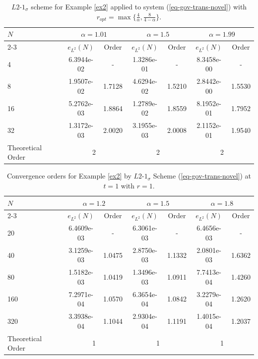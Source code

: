 \documentclass[11pt]{article}
\numberwithin{equation}{section}
\begin{document}
\iffalse
\begin{table}[!ht]
\caption{$L2$-$1_\sigma$ scheme for Example \ref{ex2} applied to system (\ref{eq-gov-trans-novel}) with $r_{opt} =\max\{\frac{4}{\alpha},\frac{8}{4-\alpha}\}$.}\label{table8}
\renewcommand{\arraystretch}{1}
\def\temptablewidth{0.95\textwidth}
\begin{center}
 \begin{tabular*}{\temptablewidth}{@{\extracolsep{\fill}}lcccccc}\hline
 $N$  &\multicolumn{2}{c}{$\alpha=1.01$} &\multicolumn{2}{c}{$\alpha=1.5$} &\multicolumn{2}{c}{$\alpha=1.99$}\\
 \cline{2-3}\cline{4-5}\cline{6-7}
 & $e_{L^{2}}(N)$         &Order     &$e_{L^{2}}(N)$    &Order    &$e_{L^{2}}(N)$ &Order     \\ \hline   
 4   &6.3944e-02   &-       &1.3286e-01   &-        &8.3458e-00  &-  \\
 8   &1.9507e-02   &1.7128  &4.6294e-02   &1.5210   &2.8442e-00  &1.5530    \\
 16  &5.2762e-03   &1.8864  &1.2789e-02   &1.8559   &8.1952e-01  &1.7952 \\
 32  &1.3172e-03   &2.0020  &3.1955e-03   &2.0008   &2.1152e-01  &1.9540  \\\hline
 Theoretical Order
 &\multicolumn{2}{c}{2} &\multicolumn{2}{c}{2}&\multicolumn{2}{c}{2}\\ \hline
\end{tabular*}
\end{center}
\end{table}



\begin{table}[!ht]
\caption{Convergence orders for Example \ref{ex2} by $L2$-$1_\sigma$ Scheme (\ref{eq-gov-trans-novel}) at $t=1$ with $r=1$.}
\renewcommand{\arraystretch}{1}
\def\temptablewidth{0.95\textwidth}
\begin{center}
 \begin{tabular*}{\temptablewidth}{@{\extracolsep{\fill}}lcccccc}\hline
 $N$  &\multicolumn{2}{c}{$\alpha=1.2$} &\multicolumn{2}{c}{$\alpha=1.5$} &\multicolumn{2}{c}{$\alpha=1.8$}\\
 \cline{2-3}\cline{4-5}\cline{6-7}
 & $e_{L^{2}}(N)$         &Order     &$e_{L^{2}}(N)$    &Order    &$e_{L^{2}}(N)$ &Order     \\ \hline
 20  &6.4609e-03   &-       &6.3061e-03   &-        &6.4656e-03  &-  \\
 40  &3.1259e-03   &1.0475  &2.8750e-03   &1.1332   &2.0801e-03  &1.6362    \\
 80  &1.5182e-03   &1.0419  &1.3496e-03   &1.0911   &7.7413e-04  &1.4260 \\
 160 &7.2971e-04   &1.0570  &6.3654e-04   &1.0842   &3.2279e-04  &1.2620    \\
 320 &3.3938e-04   &1.1044  &2.9304e-04   &1.1191   &1.4015e-04  &1.2037  \\\hline
 Theoretical Order
 &\multicolumn{2}{c}{1} &\multicolumn{2}{c}{1}&\multicolumn{2}{c}{1}\\ \hline
\end{tabular*}
\end{center}
\end{table}
\end{document}
